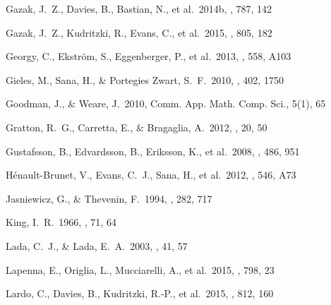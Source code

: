 \documentclass[useAMS,usenatbib]{mn2e}
\begin{document}
\begin{thebibliography}{99}
 Gazak, J.~Z., Davies, B.,
Bastian, N., et al.\ 2014b, \apj, 787, 142

 Gazak, J.~Z., Kudritzki,
R., Evans, C., et al.\ 2015, \apj, 805, 182

 Georgy, C., Ekstr{\"o}m, S., Eggenberger, P., et al.\ 2013, \aap, 558, A103

 Gieles, M., Sana, H.,
\& Portegies Zwart, S.~F.\ 2010, \mnras, 402, 1750



 Goodman, J., \&
Weare, J.\ 2010, Comm. App. Math. Comp. Sci., 5(1), 65

 Gratton, R.~G., Carretta, E., \& Bragaglia, A.\ 2012, \aapr, 20, 50


 Gustafsson, B., Edvardsson, B., Eriksson, K., et al.\ 2008, \aap, 486, 951

 H{\'e}nault-Brunet, V., Evans, C.~J., Sana, H., et al.\ 2012, \aap, 546, A73

 Jasniewicz, G., \& Thevenin, F.\ 1994, \aap, 282, 717

 King, I.~R.\ 1966, \aj, 71, 64

 Lada, C.~J., \& Lada, E.~A.\ 2003, \araa, 41, 57

 Lapenna, E., Origlia,
L., Mucciarelli, A., et al.\ 2015, \apj, 798, 23

 Lardo, C., Davies, B.,
Kudritzki, R.-P., et al.\ 2015, \apj, 812, 160



\end{thebibliography}
\end{document}
